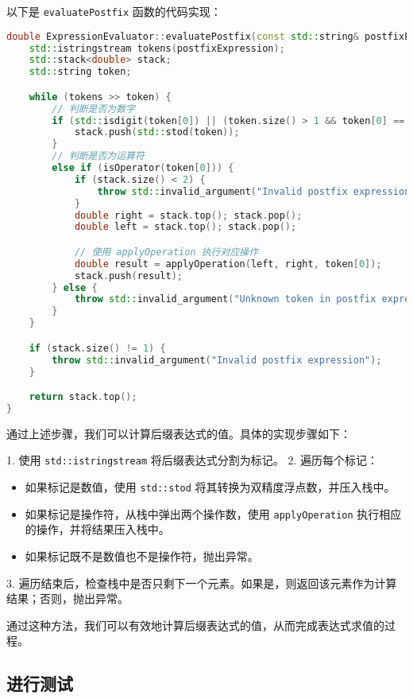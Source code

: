 \documentclass[UTF8]{ctexart}
\begin{document}
以下是 \texttt{evaluatePostfix} 函数的代码实现：

\begin{lstlisting}[language=C++, breaklines=true]
double ExpressionEvaluator::evaluatePostfix(const std::string& postfixExpression) {
    std::istringstream tokens(postfixExpression);
    std::stack<double> stack;
    std::string token;

    while (tokens >> token) {
        // 判断是否为数字
        if (std::isdigit(token[0]) || (token.size() > 1 && token[0] == '-')) {
            stack.push(std::stod(token));
        } 
        // 判断是否为运算符
        else if (isOperator(token[0])) {
            if (stack.size() < 2) {
                throw std::invalid_argument("Invalid postfix expression");
            }
            double right = stack.top(); stack.pop();
            double left = stack.top(); stack.pop();

            // 使用 applyOperation 执行对应操作
            double result = applyOperation(left, right, token[0]);
            stack.push(result);
        } else {
            throw std::invalid_argument("Unknown token in postfix expression: " + token);
        }
    }

    if (stack.size() != 1) {
        throw std::invalid_argument("Invalid postfix expression");
    }

    return stack.top();
}
\end{lstlisting}

通过上述步骤，我们可以计算后缀表达式的值。具体的实现步骤如下：

1. 使用 \texttt{std::istringstream} 将后缀表达式分割为标记。
2. 遍历每个标记：
   \begin{itemize}
     \item 如果标记是数值，使用 \texttt{std::stod} 将其转换为双精度浮点数，并压入栈中。
     \item 如果标记是操作符，从栈中弹出两个操作数，使用 \texttt{applyOperation} 执行相应的操作，并将结果压入栈中。
     \item 如果标记既不是数值也不是操作符，抛出异常。
   \end{itemize}
3. 遍历结束后，检查栈中是否只剩下一个元素。如果是，则返回该元素作为计算结果；否则，抛出异常。

通过这种方法，我们可以有效地计算后缀表达式的值，从而完成表达式求值的过程。

\subsection{进行测试}
\end{document}

